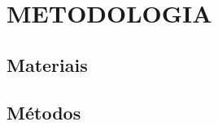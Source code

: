 \chapter{METODOLOGIA}
\label{capitulo-metodologia}


\section{Materiais}
\label{capitulo-metodologia-materiais}

\section{Métodos}
\label{capitulo-metodologia-metodos}

